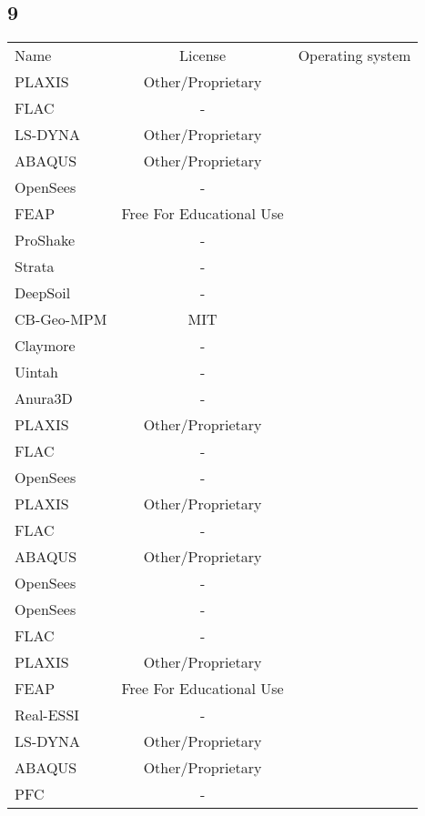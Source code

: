 \subsection{9}

\begin{table}[]
    \centering
    \begin{tabular}{l|cc}
    \toprule
    Name &  License & Operating system\\ 
        PLAXIS &  Other/Proprietary  &\\
        FLAC & - &\\
        LS-DYNA &  Other/Proprietary  &\\
        ABAQUS &  Other/Proprietary  &\\
        OpenSees & - &\\
        FEAP &  Free For Educational Use &\\
        ProShake & - &\\
        Strata & - &\\
        DeepSoil & - &\\
        CB-Geo-MPM &  MIT  &\\
        Claymore & - &\\
        Uintah & - &\\
        Anura3D & - &\\
        PLAXIS &  Other/Proprietary  &\\
        FLAC & - &\\
        OpenSees & - &\\
        PLAXIS &  Other/Proprietary  &\\
        FLAC & - &\\
        ABAQUS &  Other/Proprietary  &\\
        OpenSees & - &\\
        OpenSees & - &\\
        FLAC & - &\\
        PLAXIS &  Other/Proprietary  &\\
        FEAP &  Free For Educational Use &\\
        Real-ESSI & - &\\
        LS-DYNA &  Other/Proprietary  &\\
        ABAQUS &  Other/Proprietary  &\\
        PFC & - &\\ 
    \bottomrule
    \end{tabular}
\end{table}

